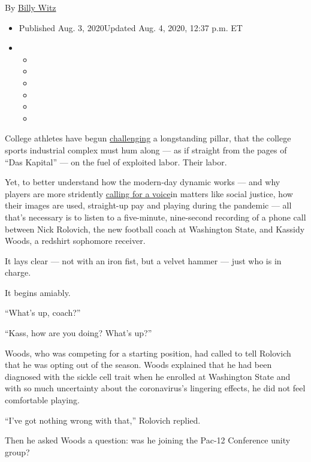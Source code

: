 By \href{https://www.nytimes3xbfgragh.onion/by/billy-witz}{Billy Witz}

\begin{itemize}
\item
  Published Aug. 3, 2020Updated Aug. 4, 2020, 12:37 p.m. ET
\item
  \begin{itemize}
  \item
  \item
  \item
  \item
  \item
  \item
  \end{itemize}
\end{itemize}

College athletes have begun
\href{https://www.nytimes3xbfgragh.onion/2020/06/12/sports/ncaafootball/george-floyd-protests-college-sports.html}{challenging}
a longstanding pillar, that the college sports industrial complex must
hum along --- as if straight from the pages of ``Das Kapital'' --- on
the fuel of exploited labor. Their labor.

Yet, to better understand how the modern-day dynamic works --- and why
players are more stridently
\href{https://www.nytimes3xbfgragh.onion/2020/08/02/sports/ncaafootball/coronavirus-college-football-pac-12.html}{calling
for a voice}in matters like social justice, how their images are used,
straight-up pay and playing during the pandemic --- all that's necessary
is to listen to a five-minute, nine-second recording of a phone call
between Nick Rolovich, the new football coach at Washington State, and
Kassidy Woods, a redshirt sophomore receiver.

It lays clear --- not with an iron fist, but a velvet hammer --- just
who is in charge.

It begins amiably.

``What's up, coach?''

``Kass, how are you doing? What's up?''

Woods, who was competing for a starting position, had called to tell
Rolovich that he was opting out of the season. Woods explained that he
had been diagnosed with the sickle cell trait when he enrolled at
Washington State and with so much uncertainty about the coronavirus's
lingering effects, he did not feel comfortable playing.

``I've got nothing wrong with that,'' Rolovich replied.

Then he asked Woods a question: was he joining the Pac-12 Conference
unity group?

